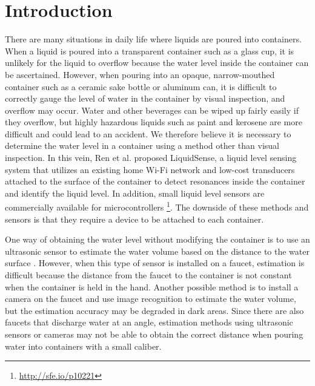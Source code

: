 \documentclass[sigconf]{acmart}
\begin{document}
\section{Introduction}
There are many situations in daily life where liquids are poured into containers. When a liquid is poured into a transparent container such as a glass cup, it is unlikely for the liquid to overflow because the water level inside the container can be ascertained. However, when pouring into an opaque, narrow-mouthed container such as a ceramic sake bottle or aluminum can, it is difficult to correctly gauge the level of water in the container by visual inspection, and overflow may occur. Water and other beverages can be wiped up fairly easily if they overflow, but highly hazardous liquids such as paint and kerosene are more difficult and could lead to an accident. We therefore believe it is necessary to determine the water level in a container using a method other than visual inspection. In this vein, Ren et al. \cite{LiquidSense} proposed LiquidSense, a liquid level sensing system that utilizes an existing home Wi-Fi network and low-cost transducers attached to the surface of the container to detect resonances inside the container and identify the liquid level. In addition, small liquid level sensors are commercially available for microcontrollers \footnote{\url{http://sfe.io/p10221}}. The downside of these methods and sensors is that they require a device to be attached to each container.\par

One way of obtaining the water level without modifying the container is to use an ultrasonic sensor to estimate the water volume based on the distance to the water surface \cite{smart_faucet1}. However, when this type of sensor is installed on a faucet, estimation is difficult because the distance from the faucet to the container is not constant when the container is held in the hand. Another possible method is to install a camera on the faucet and use image recognition to estimate the water volume, but the estimation accuracy may be degraded in dark areas. Since there are also faucets that discharge water at an angle, estimation methods using ultrasonic sensors or cameras may not be able to obtain the correct distance when pouring water into containers with a small caliber.\par
\end{document}

